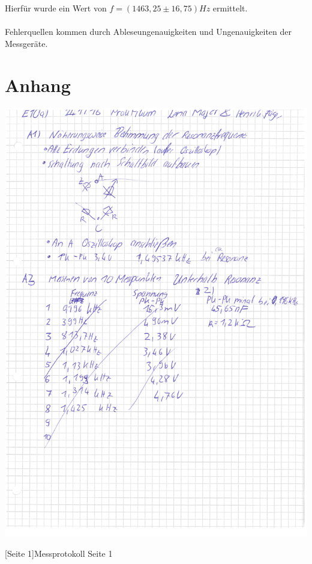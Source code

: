 \documentclass[12pt,a4paper,]{scrreprt}
\begin{document}
   Hierfür wurde ein Wert von $f=(1463,25 \pm 16,75) Hz$ ermittelt.\\
   \\
   Fehlerquellen kommen durch Ableseungenauigkeiten und Ungenauigkeiten der Messgeräte.
	\pagebreak

	\section{Anhang}
    
    \begin{center}
    		\includegraphics[scale=0.65]{Daten/1.jpg}
    	\end{center}
    	[Seite 1]{Messprotokoll Seite 1}
    	\pagebreak
    	
\end{document}
